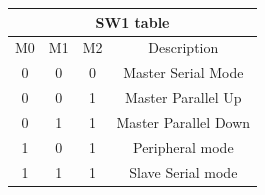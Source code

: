 \begin{longtable}{|c|c|c|c|} \hline
			\multicolumn{4}{|c|}{SW1 table}\\ \hline
	M0 & M1 & M2 & Description \\ \hline
	0 & 0 & 0 & Master Serial Mode \\ \hline
	0 & 0 & 1 & Master Parallel Up \\ \hline
	0 & 1 & 1 & Master Parallel Down \\ \hline
	1 & 0 & 1 & Peripheral mode \\ \hline
	1 & 1 & 1 & Slave Serial mode \\ \hline
	
\end{longtable}	
